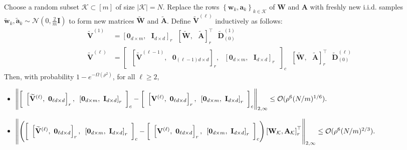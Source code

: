 \begin{claim}\label{clam:stabizable_V}
	Choose a random subset $\mathcal{K} \subset[m]$ of size $|\mathcal{K}|=N$. Replace the rows $\left\{\mathbf{w}_{k}, \mathbf{a}_{k}\right\}_{k \in \mathcal{K}}$ of $\mathbf{W}$ and $\mathbf{A}$ with freshly new i.i.d. samples $\widetilde{\mathbf{w}}_{k}, \widetilde{\mathbf{a}}_{k} \sim \mathcal{N}\left(0, \frac{2}{m} \mathbf{I}\right)$ to form new matrices $\widetilde{\mathbf{W}}$ and $\widetilde{\mathbf{A}}$. Define $\widetilde{\mathbf{V}}^{(\ell)}$ inductively as follows:
	\begin{align*}
		\widetilde{\mathbf{V}}^{(1)} &= \left[\mathbf{0}_{d \times m}, \text{ } \mathbf{I}_{d \times d}\right]_r \text{ }  \left[\widetilde{\mathbf{W}}, \text{ } \widetilde{\mathbf{A}}\right]_r^{\top} \text{ }  \widetilde{\mathbf{D}}^{(1)}_{(0)} \\
		\widetilde{\mathbf{V}}^{(\ell)} &= \left[\text{ }\left[\widetilde{\mathbf{V}}^{(\ell - 1)}, \text{ } \mathbf{0}_{(\ell - 1)d \times d}\right]_r,\text{ } \left[\mathbf{0}_{d \times m},\text{ } \mathbf{I}_{d \times d}\right]_r\text{ }\right]_c  \text{ } \left[\widetilde{\mathbf{W}}, \text{ } \widetilde{\mathbf{A}}\right]_r^{\top} \text{ }  \widetilde{\mathbf{D}}^{(\ell)}_{(0)}
	\end{align*}
	Then, with probability $1-e^{-\Omega(\rho^2)}$, for all $\ell \ge 2$,
	\begin{itemize}
		\item $\norm{\left[\text{ }\left[\widetilde{\mathbf{V}}^{(\ell)}, \text{ } \mathbf{0}_{\ell d \times d}\right]_r,\text{ } \left[\mathbf{0}_{d \times m},\text{ } \mathbf{I}_{d \times d}\right]_r\text{ }\right]_c  - \left[\text{ }\left[\mathbf{V}^{(\ell)}, \text{ } \mathbf{0}_{\ell d \times d}\right]_r,\text{ } \left[\mathbf{0}_{d \times m},\text{ } \mathbf{I}_{d \times d}\right]_r\text{ }\right]_c }_{2, \infty} \le \mathcal{O}(\rho^6 (N/m)^{1/6}).$
		\item $\norm{ \left( \left[\text{ }\left[\widetilde{\mathbf{V}}^{(\ell) }, \text{ } \mathbf{0}_{\ell d \times d}\right]_r,\text{ } \left[\mathbf{0}_{d \times m},\text{ } \mathbf{I}_{d \times d}\right]_r\text{ }\right]_c  - \left[\text{ }\left[\mathbf{V}^{(\ell)}, \text{ } \mathbf{0}_{\ell d \times d}\right]_r,\text{ } \left[\mathbf{0}_{d \times m},\text{ } \mathbf{I}_{d \times d}\right]_r\text{ }\right]_c  \right) \left[\mathbf{W}_{\mathcal{K}}, \mathbf{A}_{\mathcal{K}} \right]_r^{\top} }_{2, \infty} \le \mathcal{O}(\rho^6 (N/m)^{2/3}).$
	\end{itemize}
	
\end{claim}


